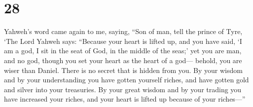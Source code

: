 \hypertarget{section-26}{%
\section{28}\label{section-26}}

 Yahweh's word came again to me, saying,  ``Son
of man, tell the prince of Tyre, `The Lord Yahweh says: ``Because your
heart is lifted up, and you have said, `I am a god, I sit in the seat of
God, in the middle of the seas;' yet you are man, and no god, though you
set your heart as the heart of a god---  behold, you are
wiser than Daniel. There is no secret that is hidden from you.
 By your wisdom and by your understanding you have gotten
yourself riches, and have gotten gold and silver into your treasuries.
 By your great wisdom and by your trading you have increased
your riches, and your heart is lifted up because of your riches---''


